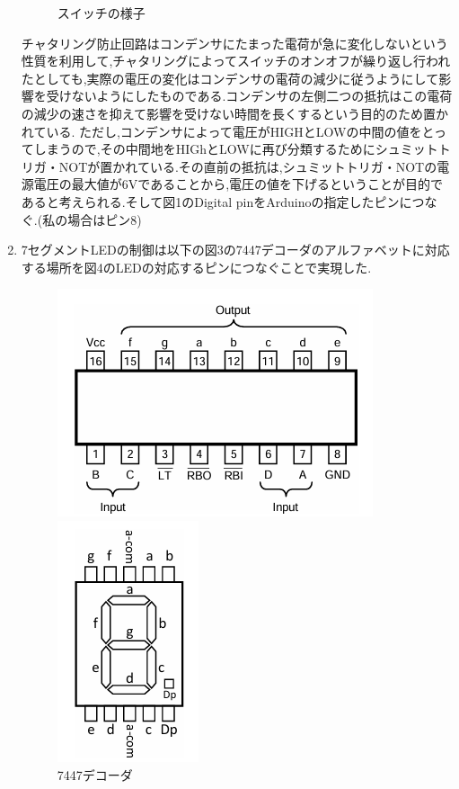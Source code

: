 \documentclass[dvipdfmx]{jarticle}
\begin{document}
\begin{enumerate}
\begin{figure}[h]
\begin{minipage}[b]{0.45\linewidth}
          \caption{スイッチの様子}
        \end{minipage}
      \end{figure}
      チャタリング防止回路はコンデンサにたまった電荷が急に変化しないという性質を利用して,チャタリングによってスイッチのオンオフが繰り返し行われたとしても,実際の電圧の変化はコンデンサの電荷の減少に従うようにして影響を受けないようにしたものである.コンデンサの左側二つの抵抗はこの電荷の減少の速さを抑えて影響を受けない時間を長くするという目的のため置かれている.
    ただし,コンデンサによって電圧がHIGHとLOWの中間の値をとってしまうので,その中間地をHIGhとLOWに再び分類するためにシュミットトリガ・NOTが置かれている.その直前の抵抗は,シュミットトリガ・NOTの電源電圧の最大値が6Vであることから,電圧の値を下げるということが目的であると考えられる.\cite{3}そして図1のDigital pinをArduinoの指定したピンにつなぐ.(私の場合はピン8)
    \item 7セグメントLEDの制御は以下の図3の7447デコーダのアルファベットに対応する場所を図4のLEDの対応するピンにつなぐことで実現した.\cite{1}
    \begin{figure}[h]
        \begin{minipage}[b]{0.45\linewidth}
          \centering
          \includegraphics[keepaspectratio, scale=0.4]{7447.png}
          \caption{7447デコーダ}
        \end{minipage}
        \begin{minipage}[b]{0.45\linewidth}
          \centering
          \includegraphics[keepaspectratio, scale=0.4]{7seg.png}

\end{minipage}
\end{figure}
\end{enumerate}
\end{document}
